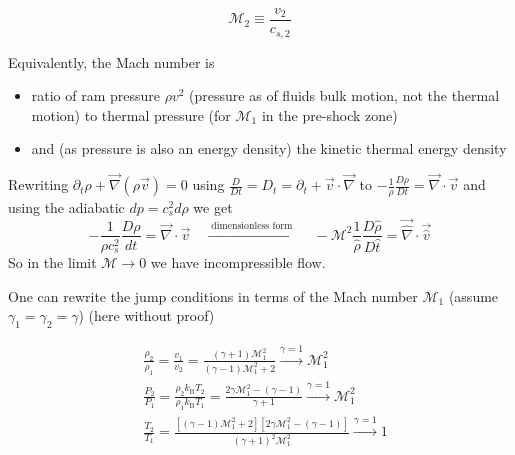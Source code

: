 \begin{equation}
    \mathcal{M}_2 \equiv \frac{v_2}{c_{s,2}}
\end{equation}

Equivalently, the Mach number is
\begin{itemize}
    \item ratio of ram pressure $\rho v^2$ (pressure as of fluids bulk motion, not the thermal motion) to thermal pressure (for $\mathcal{M}_1$ in the pre-shock zone)
    \item and (as pressure is also an energy density) the kinetic thermal energy density
\end{itemize}


Rewriting $\partial_t \rho + \vec{\nabla} \left(\rho \vec{v} \right) = 0$ using $\frac{D}{Dt} = D_t = \partial_t + \vec{v} \cdot \vec{\nabla}$
to $-\frac{1}{\rho}\frac{D\rho}{Dt} = \vec{\nabla} \cdot \vec{v}$ and using the adiabatic $dp = c_s^2 d\rho$ we get
\begin{equation}
    -\frac{1}{\rho c_s^2} \frac{D\rho}{dt} = \vec{\nabla} \cdot \vec{v} \quad \xrightarrow{\text { dimensionless form }} \quad -\mathcal{M}^2 \frac{1}{\hat{\rho}} \frac{D\hat{\rho}}{D\hat{t}} = \vec{\hat{\nabla}} \cdot \vec{\hat{v}}
\end{equation}
So in the limit $\mathcal{M} \rightarrow 0$ we have incompressible flow.

One can rewrite the jump conditions in terms of the Mach number $\mathcal{M}_1$ (assume $\gamma_1 = \gamma_2 = \gamma$) (here
without proof)

\begin{equation}
    \begin{aligned}
    & \frac{\rho_2}{\rho_1}=\frac{v_1}{v_2}=\frac{(\gamma+1) \mathcal{M}_1^2}{(\gamma-1) \mathcal{M}_1^2+2} \stackrel{\gamma=1}{\longrightarrow} \mathcal{M}_1^2 \\
    & \frac{P_2}{P_1}=\frac{\rho_2 k_{\mathrm{B}} T_2}{\rho_1 k_{\mathrm{B}} T_1}=\frac{2 \gamma \mathcal{M}_1^2-(\gamma-1)}{\gamma+1} \stackrel{\gamma=1}{\longrightarrow} \mathcal{M}_1^2 \\
    & \frac{T_2}{T_1}=\frac{\left[(\gamma-1) \mathcal{M}_1^2+2\right]\left[2 \gamma \mathcal{M}_1^2-(\gamma-1)\right]}{(\gamma+1)^2 \mathcal{M}_1^2} \stackrel{\gamma=1}{\longrightarrow} 1
    \end{aligned}
\end{equation}

